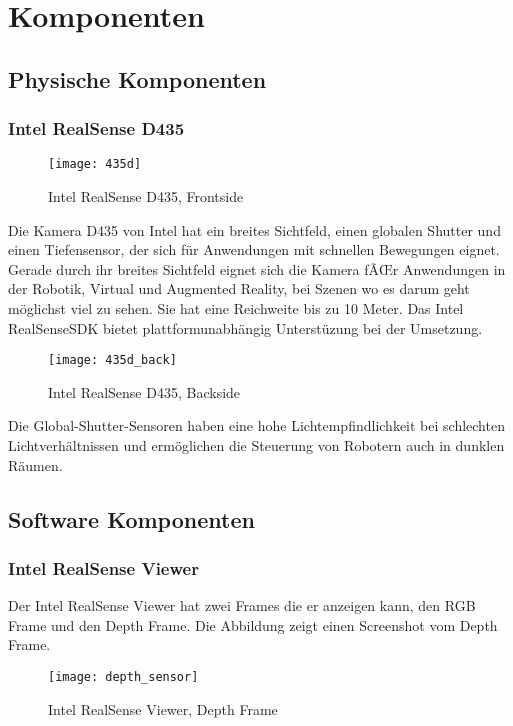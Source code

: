 \section{Komponenten}

\subsection{Physische Komponenten}

\subsubsection{Intel RealSense D435}

\begin{figure}[hbt!]
\texttt{[image: 435d]}
\caption{Intel RealSense D435, Frontside}
\end{figure}

Die Kamera D435 von Intel hat ein breites Sichtfeld, einen globalen Shutter und einen Tiefensensor, der sich f\"ur Anwendungen mit schnellen Bewegungen eignet. Gerade durch ihr breites Sichtfeld eignet sich die Kamera fÃŒr Anwendungen in der Robotik, Virtual und Augmented Reality, bei Szenen wo es darum geht m\"oglichst viel zu sehen. Sie hat eine Reichweite bis zu 10 Meter. Das Intel RealSenseSDK bietet plattformunabh\"angig Unterst\"uzung bei der Umsetzung.
			
\begin{figure}[hbt!]
\texttt{[image: 435d\_back]}
\caption{Intel RealSense D435, Backside}
\end{figure}
			
Die Global-Shutter-Sensoren haben eine hohe Lichtempfindlichkeit bei schlechten Lichtverh\"altnissen und erm\"oglichen die Steuerung von Robotern auch in dunklen R\"aumen.
\cite{Intel}

\subsection{Software Komponenten}

\subsubsection{Intel RealSense Viewer}

Der Intel RealSense Viewer hat zwei Frames die er anzeigen kann, den RGB Frame und den Depth Frame. Die Abbildung zeigt einen Screenshot vom Depth Frame.

\begin{figure}[hbt!]
\texttt{[image: depth\_sensor]}
\caption{Intel RealSense Viewer, Depth Frame}
\end{figure}
		
